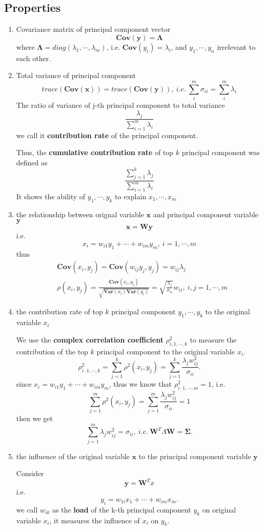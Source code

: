 \subsection{Properties}
\begin{enumerate}
\item Covariance matrix of principal component vector
	\[\mathbf{Cov}(\mathbf{y}) = \mathbf{\Lambda}\]
	where $\mathbf{\Lambda} = diag(\lambda_1,\cdots,\lambda_m)$, i.e. $\mathbf{Cov}(y_i) = \lambda_i$, and $y_1,\cdots,y_n$ irrelevant to each other.

\item Total variance of principal component
	\[	
		trace(\mathbf{Cov}(\mathbf{x})) = trace(\mathbf{Cov}(\mathbf{y})),~i.e.~ \sum_i^m \sigma_{ii} = \sum_i^m \lambda_i 
	\]
	The ratio of variance of j-th principal component to total variance
	\[	
		\frac{\lambda_j}{\sum_{i=1}^{m}\lambda_i}
	\]
	we call it \textbf{contribution rate} of the principal component.

	Thus, the \textbf{cumulative contribution rate} of top $k$ principal component was defined as 
	\[	
		\frac{\sum_{j=1}^{k}\lambda_j}{\sum_{i=1}^{m}\lambda_i}
	\]
	It shows the ability of $y_1,\cdots,y_k$ to explain $x_1,\cdots,x_m$

\item the relationship between orignal variable $\mathbf{x}$ and principal component variable $\mathbf{y}$
	\[	
		\mathbf{x} = \mathbf{Wy}
	\]
	i.e.
	\[	
		x_i = w_{i1}y_1 + \cdots + w_{im}y_m,~i = 1,\cdots,m
	\]
	thus
	\begin{align*}
		& \mathbf{Cov}(x_i,y_j) = \mathbf{Cov}(w_{ij}y_j,y_j) = w_{ij}\lambda_j\\
		& \rho(x_i,y_j) = \frac{\mathbf{Cov}(x_i,y_j)}{\sqrt{\mathbf{Var}(x_i)\mathbf{Var}(y_i)}} = \sqrt{\frac{\lambda_j}{\sigma_{ii}}}w_{ij},~i,j = 1,\cdots,m
	\end{align*}

\item the contribution rate of top $k$ principal component $y_1,\cdots,y_k$ to the original variable $x_i$

	We use the \textbf{complex correlation coefficient} $\rho_{i\dot,1,\cdots,k}^2$ to measure the contribution of the top $k$ principal component to the original variable $x_i$.
	\[
		\rho_{i\cdot 1,\cdots,k}^2 = \sum_{j=1}^{k}\rho^2(x_i,y_j) = \sum_{j=1}^{k} \frac{\lambda_j w_{ij}^2}{\sigma_{ii}}.
	\]
	since $x_i = w_{i1}y_1 + \cdots + w_{im}y_m$, thus we know that $\rho_{i\cdot 1,\cdots,m}^2 = 1$, i.e.
	\[
		\sum_{j=1}^{m} \rho^2(x_i,y_j) = \sum_{j=1}^{m} \frac{\lambda_j w_{ij}^2}{\sigma_{ii}} = 1
	\]
	then we get 
	\[
		\sum_{j=1}^{m} \lambda_j w_{ij}^2 = \sigma_{ii},~i.e.~\mathbf{W}^T\Lambda\mathbf{W} = \mathbf{\Sigma}.
	\]
	
\item the influence of the original variable $\mathbf{x}$ to the principal component variable $\mathbf{y}$

	Consider 
	\[
		\mathbf{y} = \mathbf{W}^Tx 
	\]
	i.e.
	\[
		y_i = w_{1i} x_1 + \cdots + w_{mi} x_m.
	\]
	we call $w_{ik}$ as the \textbf{load} of the k-th principal component $y_k$ on original variable $x_i$, it measures the influence of $x_i$ on $y_k$.
\end{enumerate}
